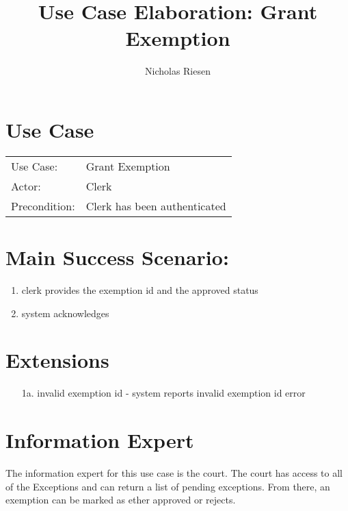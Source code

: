 \documentclass{article}
\title{Use Case Elaboration: Grant Exemption}
\author{Nicholas Riesen}
\begin{document}
\maketitle

\section*{Use Case}
\begin{tabular}{l l}
  Use Case:     & Grant Exemption              \\
  Actor:        & Clerk                        \\
  Precondition: & Clerk has been authenticated \\
\end{tabular}

\section*{Main Success Scenario:}
\begin{enumerate}
  \item clerk provides the exemption id and the approved status
  \item system acknowledges 
\end{enumerate}

\section*{Extensions}
\begin{itemize}
  \item [1a.] invalid exemption id
        - system reports invalid exemption id error

\end{itemize}

\section*{Information Expert}
The information expert for this use case is the court. The court has access to all of the Exceptions and can return a list of pending exceptions. From there, an exemption can be marked as ether approved or rejects.
\end{document}
